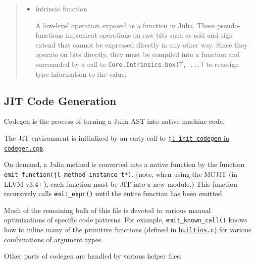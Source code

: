 \begin{quote}
\begin{itemize}
\item intrinsic function

A low-level operation exposed as a function in Julia. These pseudo-functions implement operations on raw bits such as add and sign extend that cannot be expressed directly in any other way. Since they operate on bits directly, they must be compiled into a function and surrounded by a call to \texttt{Core.Intrinsics.box(T, ...)} to reassign type information to the value.

\end{itemize}
\end{quote}


\hypertarget{16251221274618963128}{}


\subsection{JIT Code Generation}



Codegen is the process of turning a Julia AST into native machine code.



The JIT environment is initialized by an early call to \href{https://github.com/JuliaLang/julia/blob/master/src/codegen.cpp}{\texttt{jl\_init\_codegen} in \texttt{codegen.cpp}}.



On demand, a Julia method is converted into a native function by the function \texttt{emit\_function(jl\_method\_instance\_t*)}. (note, when using the MCJIT (in LLVM v3.4+), each function must be JIT into a new module.) This function recursively calls \texttt{emit\_expr()} until the entire function has been emitted.



Much of the remaining bulk of this file is devoted to various manual optimizations of specific code patterns. For example, \texttt{emit\_known\_call()} knows how to inline many of the primitive functions (defined in \href{https://github.com/JuliaLang/julia/blob/master/src/builtins.c}{\texttt{builtins.c}}) for various combinations of argument types.



Other parts of codegen are handled by various helper files:



